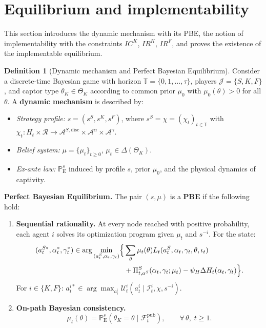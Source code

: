 \documentclass[ecta,nameyear,final,supplement]{econsocart}
\numberwithin{equation}{section}
\numberwithin{table}{section}
\theoremstyle{definition}
\newtheorem{definition}[theorem]{Definition}
\newcommand{\ProbE}{\mathbb{P}_{\mathrm{E}}}
\begin{document}
\section{Equilibrium and implementability}
\label{sec:equilibrio}

\noindent This section introduces the dynamic mechanism with its PBE, the
notion of implementability with the constraints $IC^K$, $IR^K$, $IR^F$, and
proves the existence of the implementable equilibrium.


\begin{definition}[Dynamic mechanism and Perfect Bayesian Equilibrium]
\label{def:pbe-mechanism}
Consider a discrete-time Bayesian game with horizon
$\mathbb{T}=\{0,1,\ldots,\tau\}$, players $\mathcal{J}=\{S,K,F\}$, and captor
type $\theta_K\in\Theta_K$ according to common prior $\mu_0$ with
$\mu_0(\theta)>0$ for all $\theta$. A \textbf{dynamic mechanism} is described by:
\begin{itemize}
  \item \emph{Strategy profile:} $s=(s^S,s^K,s^F)$, where
  $s^S=\chi=(\chi_t)_{t\in\mathbb{T}}$ with
  $\chi_t:H_t\times\mathcal{R}
   \to\mathcal{A}^{S,\mathrm{disc}}\times\mathcal{A}^\alpha\times\mathcal{A}^\gamma$.
  \item \emph{Belief system:} $\mu=\{\mu_t\}_{t\ge 0}$,
  $\mu_t\in\Delta(\Theta_K)$.
  \item \emph{Ex-ante law:} $\ProbE^s$ induced by profile $s$, prior
  $\mu_0$, and the physical dynamics of captivity.
\end{itemize}

\noindent\textbf{Perfect Bayesian Equilibrium.} The pair $(s,\mu)$ is a
\textbf{PBE} if the following hold:
\begin{enumerate}
  \item[\textup{(a)}] \textbf{Sequential rationality.}
  At every node reached with positive probability, each agent $i$ solves
  its optimization program given $\mu_t$ and $s^{-i}$. For the state:
  \[
  \begin{aligned}
  (a_t^{S\ast},\alpha_t^\ast,\gamma_t^\ast)\in
  \arg\min_{(a_t^S,\alpha_t,\gamma_t)}
  \Bigl\{&
  \sum_\theta\mu_t(\theta)L_t(a_t^S,\alpha_t,\gamma_t,\theta,\iota_t)\\
  &+\Pi_{t,a^S}^S(\alpha_t,\gamma_t;\mu_t)
  -\psi_H\Delta H_t(\alpha_t,\gamma_t)\Bigr\}.
  \end{aligned}
  \]
  For $i\in\{K,F\}$:
  $a_t^{i\ast}\in\arg\max_{a_t^i}\mathcal{U}_t^i(a_t^i\mid\mathcal{I}_t^i,\chi,s^{-i})$.
  \item[\textup{(b)}] \textbf{On-path Bayesian consistency.}
  \[
  \mu_t(\theta)=\ProbE^s(\theta_K=\theta\mid\mathcal{F}_t^{\mathrm{pub}}),
  \qquad\forall\,\theta,\;t\ge 1.
  \]
\end{enumerate}
\end{definition}
\end{document}
